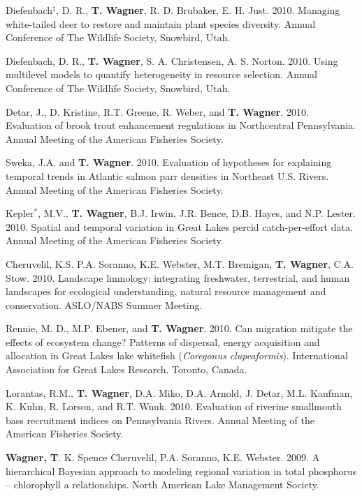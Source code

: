 \documentclass[10pt]{article}
\begin{document}
\begin{flushleft}
\begin{etaremune}
\item Diefenbach$^\ddagger$, D. R., {\bf T. Wagner}, R. D. Brubaker, E. H. Just. 2010. Managing white-tailed deer to restore and maintain plant species diversity. Annual Conference of The Wildlife Society, Snowbird, Utah. 

\item Diefenbach, D. R.,  {\bf T. Wagner}, S. A. Christensen, A. S. Norton. 2010. Using multilevel models to quantify heterogeneity in resource selection. Annual Conference of The Wildlife Society, Snowbird, Utah.

\item Detar, J., D. Kristine, R.T. Greene, R. Weber, and  {\bf T. Wagner}. 2010. Evaluation of brook trout enhancement regulations in Northcentral Pennsylvania. Annual Meeting of the American Fisheries Society. 

\item Sweka, J.A. and  {\bf T. Wagner}. 2010. Evaluation of hypotheses for explaining temporal trends in Atlantic salmon parr densities in Northeast U.S. Rivers. Annual Meeting of the American Fisheries Society.

\item Kepler$^*$, M.V.,  {\bf T. Wagner}, B.J. Irwin, J.R. Bence, D.B. Hayes, and N.P. Lester. 2010. Spatial and temporal variation in Great Lakes percid catch-per-effort data. Annual Meeting of the American Fisheries Society. 

\item Cheruvelil, K.S. P.A. Soranno, K.E. Webster, M.T. Bremigan, {\bf T. Wagner}, C.A. Stow. 2010. Landscape limnology: integrating freshwater, terrestrial, and human landscapes for ecological understanding, natural resource management and conservation. ASLO/NABS Summer Meeting.

\item Rennie, M. D., M.P. Ebener, and {\bf T. Wagner}. 2010. Can migration mitigate the effects of ecosystem change? Patterns of dispersal, energy acquisition and allocation in Great Lakes lake whitefish (\emph{Coregonus clupeaformis}). International Association for Great Lakes Research. Toronto, Canada. 

\item Lorantas, R.M., {\bf T. Wagner}, D.A. Miko, D.A. Arnold, J. Detar, M.L. Kaufman, K. Kuhn, R. Lorson, and R.T. Wnuk. 2010. Evaluation of riverine smallmouth bass recruitment indices on Pennsylvania Rivers. Annual Meeting of the American Fisheries Society. 


\item {\bf Wagner, T}. K. Spence Cheruvelil, P.A. Soranno, K.E. Webster. 2009. A hierarchical Bayesian approach to modeling regional variation in total phosphorus – chlorophyll a relationships. North American Lake Management Society.


\end{etaremune}
\end{flushleft}
\end{document}
